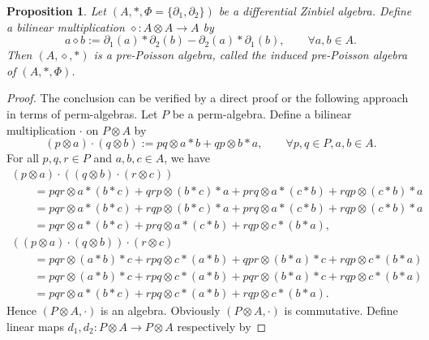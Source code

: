 \documentclass[pdftex]{sigma}
\numberwithin{equation}{section}
\newtheorem{Proposition}[Theorem]{Proposition}
{ \theoremstyle{definition}
	\newtheorem{Definition}[Theorem]{Definition}
	\newtheorem{Note}[Theorem]{Note}
	\newtheorem{Example}[Theorem]{Example}
	\newtheorem{Remark}[Theorem]{Remark} }
\begin{document}
\begin{Proposition}\label{pro:dzpp} Let $(A, \ast, \Phi = \{\partial_1, \partial_2\})$ be a differential Zinbiel algebra.
 Define a bilinear multiplication $\diamond\colon A \otimes A \to A$ by
 \begin{equation}
 a \diamond b := \partial_1(a) \ast \partial_2 (b) - \partial_2(a) \ast \partial_1(b), \qquad \forall a, b \in A. \label{eq:dzpp}
 \end{equation}
 Then $(A, \diamond, \ast)$ is a pre-Poisson algebra, called the \textit{induced pre-Poisson algebra of $(A, \ast, \Phi)$}.
\end{Proposition}
\begin{proof}The conclusion can be verified by a direct proof or the following approach in terms of perm-algebras. Let $P$ be a perm-algebra. Define a bilinear multiplication $\cdot$ on $P \otimes A$ by
 \begin{equation*}
 (p \otimes a) \cdot (q \otimes b) := pq \otimes a*b + qp \otimes b*a, \qquad \forall p, q \in P, a, b \in A.
 \end{equation*}
 For all $p, q, r \in P$ and $a, b, c \in A$, we have
 \begin{gather*}
 (p \otimes a) \cdot ((q \otimes b) \cdot (r \otimes c)) \\
 \qquad{}= pqr \otimes a \ast (b \ast c) + qrp \otimes (b \ast c) \ast a + prq \otimes a \ast (c \ast b) + rqp \otimes (c \ast b) \ast a \\
 \qquad{}=pqr \otimes a \ast (b \ast c) + rqp \otimes (b \ast c) \ast a + prq \otimes a \ast (c \ast b) + rqp \otimes (c \ast b) \ast a \\
\qquad{} = pqr \otimes a \ast (b \ast c) + prq \otimes a \ast (c \ast b) + rqp \otimes c \ast (b \ast a), \\
 ((p \otimes a) \cdot (q \otimes b)) \cdot (r \otimes c) \\
\qquad{} = pqr \otimes (a \ast b) \ast c + rpq \otimes c \ast (a \ast b) + qpr \otimes (b \ast a) \ast c + rqp \otimes c \ast (b \ast a) \\
\qquad{} = pqr \otimes (a \ast b) \ast c + rpq \otimes c \ast (a \ast b) + pqr \otimes (b \ast a) \ast c + rqp \otimes c \ast (b \ast a) \\
\qquad{} = pqr \otimes a \ast (b \ast c) + rpq \otimes c \ast (a \ast b) + rqp \otimes c \ast (b \ast a).
	\end{gather*}
 Hence $(P \otimes A, \cdot)$ is an algebra. Obviously $(P \otimes A, \cdot)$ is commutative.
 Define linear maps $d_1,d_2\colon P \otimes A \to P \otimes A$ respectively by

\end{proof}
\end{document}
